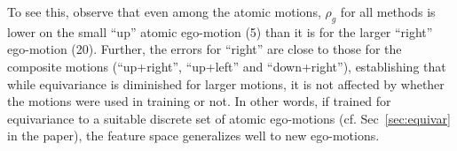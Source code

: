 \documentclass[10pt,twocolumn,letterpaper]{article}
\begin{document}
To see this, observe that even among the atomic motions, $\rho_g$ for all methods is lower on the small ``up'' atomic ego-motion (5\textdegree) than it is for the larger ``right'' ego-motion (20\textdegree). Further, the errors for ``right'' are close to those for the composite motions (``up+right'', ``up+left'' and ``down+right''), establishing that while equivariance is diminished for larger motions, it is not affected by whether the motions were used in training or not. In other words, if trained for equivariance to a suitable discrete set of atomic ego-motions (cf. Sec~\ref{sec:equivar} in the paper), the feature space generalizes well to new ego-motions.

\begin{table}[t]
  \centering
    \small{
\caption{The ``normalized error'' equivariance measure $\rho_g$ for individual ego-motions (Eq~\eqref{eq:equiv_measure}) on NORB, organized as ``atomic'' (motions in the \textsc{equiv} training set) and ``composite'' (novel) ego-motions.}
\label{tab:equiv_measurement}
}

\end{table}
\end{document}
